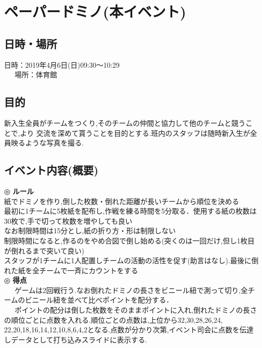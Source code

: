 \documentclass[a4j]{jarticle}
\begin{document}
\section{ペーパードミノ(本イベント)}
\subsection{日時・場所}
日時：2019年4月6日(日)09:30〜10:29\\
\ \ \ 場所：体育館\\
\subsection{目的}
新入生全員がチームをつくり,そのチームの仲間と協力して他のチームと競うことで,より
交流を深めて貰うことを目的とする.班内のスタッフは随時新入生が全員映るような写真を撮る.
\subsection{イベント内容(概要)}
\hspace{-5mm}
◎ \textbf{ルール} \\
紙でドミノを作り,倒した枚数・倒れた距離が長いチームから順位を決める \\
最初に1チームに5枚紙を配布し,作戦を練る時間を5分取る．使用する紙の枚数は30枚で,手で切って枚数を増やしても良い \\
なお制限時間は15分とし,紙の折り方・形は制限しない \\
制限時間になると,作るのをやめ合図で倒し始める(突くのは一回だけ,但し1枚目が倒れるまで突いて良い) \\
スタッフが1チームに1人配置しチームの活動の活性を促す(助言はなし).最後に倒れた紙を全チームで一斉にカウントをする \\
◎ \textbf{得点} \\
\ \ \ ゲームは2回戦行う.なお倒れたドミノの長さをビニール紐で測って切り,全チームのビニール紐を並べて比べポイントを配分する．\\
\ \ \ ポイントの配分は倒した枚数をそのままポイントに入れ,倒れたドミノの長さの順位ごとに点数を入れる.順位ごとの点数は,上位から32,30,28,26,24,
22,20,18,16,14,12,10,8,6,4,2となる.点数が分かり次第,イベント司会に点数を伝達しデータとして打ち込みスライドに表示する.
\end{document}
